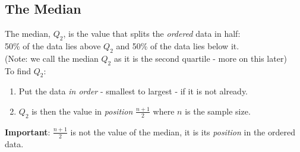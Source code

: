 \subsection{The Median}
\begin{frame}{\bf {}}
The median, $Q_2$, is the value that splits the \emph{ordered} data in half:\\
50\% of the data lies above $Q_2$ and 50\% of the data lies below it.\\
{\footnotesize(Note: we call the median $Q_2$ as it is the second quartile - more on this later)}\\[0.6cm]

To find $Q_2$:\\[0.2cm]
\begin{enumerate}[1.]\itemsep0.4cm
\item Put the data \emph{in order} - smallest to largest - if it is not already.
\item $Q_2$ is then the value in \emph{position} $\boxed{\frac{n+1}{2}}$ where $n$ is the sample size.\\[0.6cm]
\end{enumerate}

{\bf Important}: $\tfrac{n+1}{2}$ is not the value of the median, it is its \emph{position} in the\newline{} ordered data.

\end{frame}


